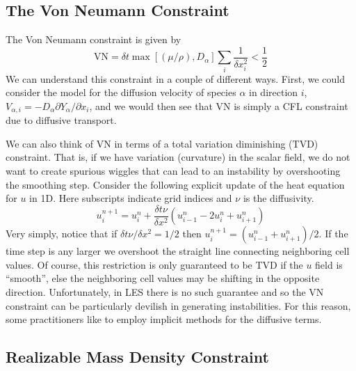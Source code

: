 \subsection{The Von Neumann Constraint}

The Von Neumann constraint is given by
\begin{equation}
\mbox{VN} = \delta t \max[(\mu/\rho),D_\alpha] \sum_i \frac{1}{\delta x_i^2} < \frac{1}{2}
\end{equation}
We can understand this constraint in a couple of different ways.  First, we could consider the model for the diffusion velocity of species $\alpha$ in direction $i$, $V_{\alpha,i} = -D_\alpha \partial Y_\alpha/\partial x_i$, and we would then see that VN is simply a CFL constraint due to diffusive transport.

We can also think of VN in terms of a total variation diminishing (TVD) constraint.  That is, if we have variation (curvature) in the scalar field, we do not want to create spurious wiggles that can lead to an instability by overshooting the smoothing step.  Consider the following explicit update of the heat equation for $u$ in 1D. Here subscripts indicate grid indices and $\nu$ is the diffusivity.
\begin{equation}
u_i^{n+1} = u_i^n + \frac{\delta t \nu}{\delta x^2} (u_{i-1}^n - 2u_i^n + u_{i+1}^n )
\end{equation}
Very simply, notice that if $\delta t \nu/\delta x^2 = 1/2$ then $u_i^{n+1} = (u_{i-1}^n + u_{i+1}^n)/2$.  If the time step is any larger we overshoot the straight line connecting neighboring cell values.  Of course, this restriction is only guaranteed to be TVD if the $u$ field is ``smooth'', else the neighboring cell values may be shifting in the opposite direction.  Unfortunately, in LES there is no such guarantee and so the VN constraint can be particularly devilish in generating instabilities. For this reason, some practitioners like to employ implicit methods for the diffusive terms.

\subsection{Realizable Mass Density Constraint}

